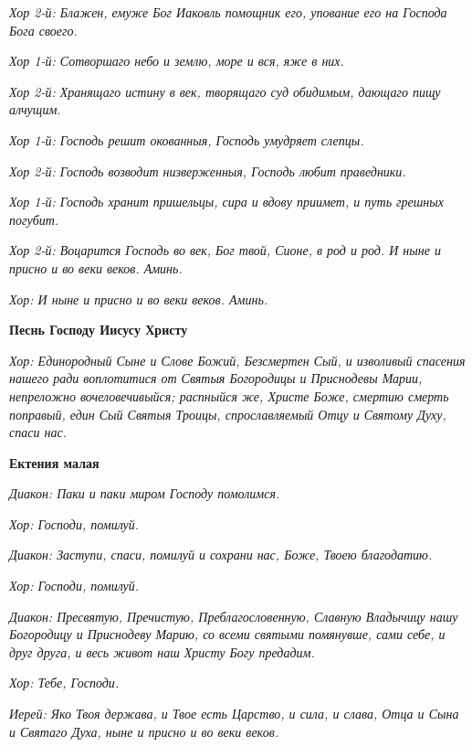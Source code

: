 \itshape Хор 2-й:\normalfont{} Блажен, емуже Бог Иаковль помощник его, упование его на Господа Бога своего.


\itshape Хор 1-й:\normalfont{} Сотворшаго небо и землю, море и вся, яже в них.


\itshape Хор 2-й:\normalfont{} Хранящаго истину в век, творящаго суд обидимым, дающаго пищу алчущим.


\itshape Хор 1-й:\normalfont{} Господь решит окованныя, Господь умудряет слепцы.


\itshape Хор 2-й:\normalfont{} Господь возводит низверженныя, Господь любит праведники.


\itshape Хор 1-й:\normalfont{} Господь хранит пришельцы, сира и вдову приимет, и путь грешных погубит.


\itshape Хор 2-й:\normalfont{} Воцарится Господь во век, Бог твой, Сионе, в род и род. И ныне и присно и во веки веков. Аминь.


\itshape Хор:\normalfont{} И ныне и присно и во веки веков. Аминь.





\bfseries Песнь Господу Иисусу Христу\normalfont{}


\itshape Хор:\normalfont{} Единородный Сыне и Слове Божий, Безсмертен Сый, и изволивый спасения нашего ради воплотитися от Святыя Богородицы и Приснодевы Марии, непреложно вочеловечивыйся; распныйся же, Христе Боже, смертию смерть поправый, един Сый Святыя Троицы, спрославляемый Отцу и Святому Духу, спаси нас.





\bfseries Ектения малая\normalfont{}


\itshape Диакон:\normalfont{} Паки и паки миром Господу помолимся.


\itshape Хор:\normalfont{} Господи, помилуй.


\itshape Диакон:\normalfont{} Заступи, спаси, помилуй и сохрани нас, Боже, Твоею благодатию.


\itshape Хор:\normalfont{} Господи, помилуй.


\itshape Диакон:\normalfont{} Пресвятую, Пречистую, Преблагословенную, Славную Владычицу нашу Богородицу и Приснодеву Марию, со всеми святыми помянувше, сами себе, и друг друга, и весь живот наш Христу Богу предадим.


\itshape Хор:\normalfont{} Тебе, Господи.


\itshape Иерей:\normalfont{} Яко Твоя держава, и Твое есть Царство, и сила, и слава, Отца и Сына и Святаго Духа, ныне и присно и во веки веков.


